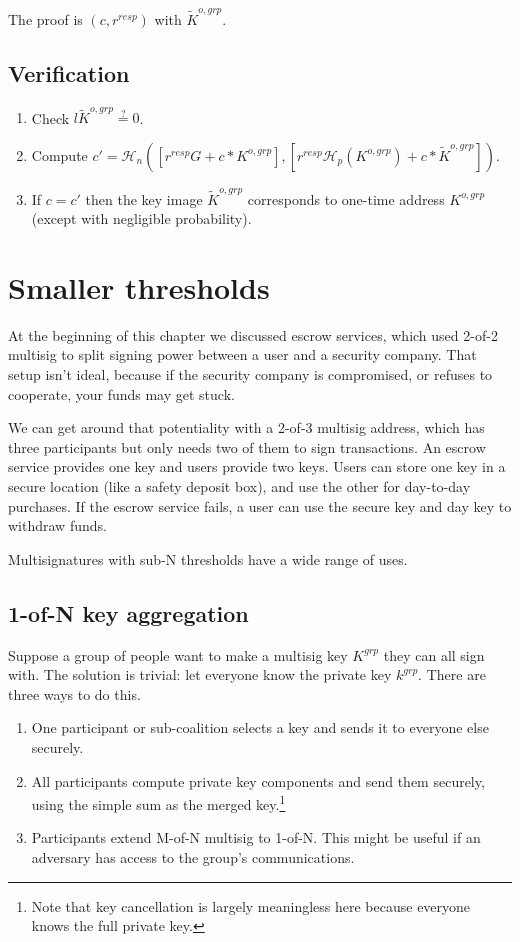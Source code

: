 The proof is $(c,r^{resp})$ with $\tilde{K}^{o,grp}$.


\subsection*{Verification}

\begin{enumerate}
    \item Check $l \tilde{K}^{o,grp} \stackrel{?}{=} 0$.
    \item Compute $c' = \mathcal{H}_n([r^{resp} G + c*K^{o,grp}],[r^{resp} \mathcal{H}_p(K^{o,grp}) + c*\tilde{K}^{o,grp}])$.
    \item If $c = c'$ then the key image $\tilde{K}^{o,grp}$ corresponds to one-time address $K^{o,grp}$ (except with negligible probability).
\end{enumerate}



\section{Smaller thresholds}
\label{sec:smaller-thresholds}

At the beginning of this chapter we discussed escrow services, which used 2-of-2 multisig to split signing power between a user and a security company. That setup isn't ideal, because if the security company is compromised, or refuses to cooperate, your funds may get stuck.

We can get around that potentiality with a 2-of-3 multisig address, which has three participants but only needs two of them to sign transactions. An escrow service provides one key and users provide two keys. Users can store one key in a secure location (like a safety deposit box), and use the other for day-to-day purchases. If the escrow service fails, a user can use the secure key and day key to withdraw funds.

Multisignatures with sub-N thresholds have a wide range of uses.


\subsection{1-of-N key aggregation}
\label{sec:1-of-n}

Suppose a group of people want to make a multisig key $K^{grp}$ they can all sign with. The solution is trivial: let everyone know the private key $k^{grp}$. There are three ways to do this.
\begin{enumerate}
    \item One participant or sub-coalition selects a key and sends it to everyone else securely.
    \item All participants compute private key components and send them securely, using the simple sum as the merged key.\footnote{Note that key cancellation is largely meaningless here because everyone knows the full private key.}
    \item Participants extend M-of-N multisig to 1-of-N. This might be useful if an adversary has access to the group's communications.
\end{enumerate}

